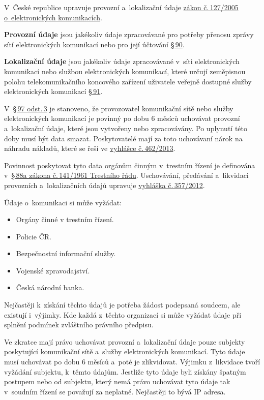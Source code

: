 V~České republice upravuje provozní a~lokalizační údaje \href{https://www.zakonyprolidi.cz/cs/2005-127}{zákon č.\,127/2005 o~elektronických komunikacích}.

\textbf{Provozní údaje} jsou jakékoliv údaje zpracovávané pro potřeby přenosu zprávy sítí elektronických komunikací nebo pro její účtování \href{https://www.zakonyprolidi.cz/cs/2005-127#p90-1}{§\,90}. 

\textbf{Lokalizační údaje} jsou jakékoliv údaje zpracovávané v~síti elektronických komunikací nebo službou elektronických komunikací, které určují zeměpisnou polohu telekomunikačního koncového zařízení uživatele veřejně dostupné služby elektronických komunikací \href{https://www.zakonyprolidi.cz/cs/2005-127#p91-1}{§\,91}.

V~\href{https://www.zakonyprolidi.cz/cs/2005-127#p97-3}{§\,97 odst.\,3} je stanoveno, že provozovatel komunikační sítě nebo služby elektronických komunikací je povinný po dobu 6 měsíců uchovávat provozní a~lokalizační údaje, které jsou vytvořeny nebo zpracovávány. Po uplynutí této doby musí být data smazat. Poskytovatelé mají za toto uchovávaní nárok na náhradu nákladů, které se řeší ve \href{https://www.zakonyprolidi.cz/cs/2013-462/zneni-20140101}{vyhlášce č.\,462/2013}.

Povinnost poskytovat tyto data orgánům činným v~trestním řízení je definována v~\href{https://www.zakonyprolidi.cz/cs/1961-141#p88a}{§\,88a zákona č.\,141/1961 Trestního řádu}. Uschovávání, předávání a~likvidaci provozních a~lokalizačních údajů upravuje \href{https://www.zakonyprolidi.cz/cs/2012-357}{vyhláška č.\,357/2012}.

Údaje o~komunikaci si může vyžádat:
\vspace{-0,2cm}
\begin{itemize}[noitemsep]
    \item Orgány činné v trestním řízení.
    \item Policie ČR.
    \item Bezpečnostní informační služby.
    \item Vojenské zpravodajství.
    \item Česká národní banka.
\end{itemize}

Nejčastěji k~získání těchto údajů je potřeba žádost podepsaná soudcem, ale existují i~výjimky. Kde každá z~těchto organizací si může vyžádat údaje při splnění podmínek zvláštního právního předpisu.

Ve zkratce mají právo uchovávat provozní a~lokalizační údaje pouze subjekty poskytující komunikační sítě a~služby elektronických komunikací. Tyto údaje musí uchovávat po dobu 6 měsíců a~poté je zlikvidovat. Výjimku z~likvidace tvoří vyžádání subjektu, k~těmto údajům. Jestliže tyto údaje byli získány špatným postupem nebo od subjektu, který nemá právo uchovávat tyto údaje tak v~soudním řízení se považují za neplatné. Nejčastěji to bývá IP adresa.


















